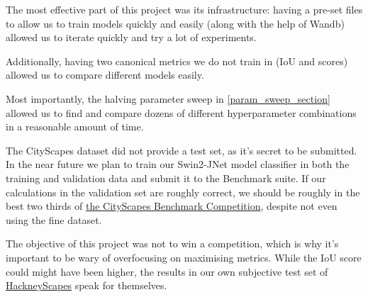The most effective part of this project was its infrastructure: having a pre-set files to allow us to train models quickly and easily (along with the help of Wandb) allowed us to iterate quickly and try a lot of experiments.

Additionally, having two canonical metrics we do not train in (IoU and \iiouc{} scores) allowed us to compare different models easily.

Most importantly, the halving parameter sweep in \cref{param_sweep_section} allowed us to find and compare dozens of different hyperparameter combinations in a reasonable amount of time.

The CityScapes dataset did not provide a test set, as it's secret to be submitted\cite{cityscapes_benchmark}.
In the near future we plan to train our Swin2-JNet model classifier in both the training and validation data and submit it to the Benchmark suite.
If our calculations in the validation set are roughly correct, we should be roughly in the best two thirds of \href{https://www.cityscapes-dataset.com/benchmarks/#pixel-level-results}{the CityScapes Benchmark Competition}, despite not even using the fine dataset.

The objective of this project was not to win a competition, which is why it's important to be wary of overfocusing on maximising metrics.
While the IoU score could might have been higher, the results in our own subjective test set of \hyperref[hackneyscapes]{HackneyScapes} speak for themselves.
